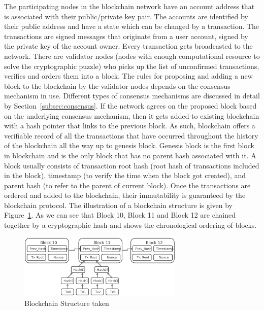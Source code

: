 The participating nodes in the blockchain network have an account address that
is associated with their public/private key pair. The accounts are identified
by their public address and have a state which can be changed by a transaction.
The transactions are signed messages that originate from a user account, signed
by the private key of the account owner. Every transaction gets broadcasted to
the network. There are validator nodes (nodes with enough computational
resource to solve the cryptographic puzzle) who picks up the list of
unconfirmed transactions, verifies and orders them into a block. The rules for
proposing and adding a new block to the blockchain by the validator nodes
depends on the consensus mechanism in use. Different types of consensus
mechanisms are discussed in detail by Section~\ref{subsec:consensus}. If the
network agrees on the proposed block based on the underlying consensus
mechanism, then it gets added to existing blockchain with a hash pointer that
links to the previous block. As such, blockchain offers a verifiable record of
all the transactions that have occurred throughout the history of the
blockchain all the way up to genesis block. Genesis block is the first block in
blockchain and is the only block that has no parent hash associated with it. A
block usually consists of transaction root hash (root hash of transactions
included in the block), timestamp (to verify the time when the block got
created), and parent hash (to refer to the parent of current block). Once the
transactions are ordered and added to the blockchain, their immutability is
guaranteed by the blockchain protocol. The illustration of a blockchain
structure is given by Figure~\ref{BlockchainStructure}. As we can see that
Block 10, Block 11 and Block 12 are chained together by a cryptographic hash
and shows the chronological ordering of blocks.
\begin{figure}
	\centering
	\includegraphics[width=0.7\textwidth]{Images/BlockchainStructure.eps}
	\caption{Blockchain Structure taken}
	\label{BlockchainStructure}
\end{figure}
